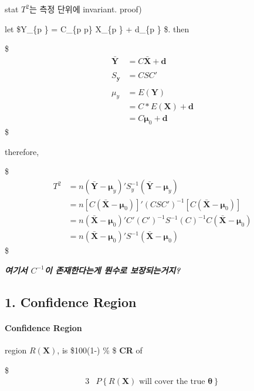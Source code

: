 \documentclass[
]{book}
\begin{document}
{{{stat \(T^2\)는 측정 단위에 invariant. proof)

let \$\pmb Y\_\{p \} = C\_\{p \times p\} \pmb X\_\{p \} + \pmb d\_\{p \} \$. then

\$
\begin{align*}
\bar {\pmb Y} &= C \bar {\pmb X} + \pmb d \\
\\

S_{\pmb y} &= CSC'\\
\\

\mu_y &= E(\pmb Y) \\
&=C \ast E(\pmb X) + \pmb d \\
&= C \pmb \mu_0 + \pmb d

\end{align*}
\$

therefore,

\$
\begin{align*}

T^2
&= n(\bar {\pmb Y} - \pmb \mu_y)' S_y^{-1} (\bar {\pmb Y} - \pmb \mu_y) \\
&= n \left[ C(\bar {\pmb X} - \pmb \mu_0) \right]' (CSC')^{-1} \left[ C(\bar {\pmb X} - \pmb \mu_0) \right] \\
&= n (\bar {\pmb X} - \pmb \mu_0)' C' (C')^{-1} S^{-1}(C)^{-1}  C(\bar {\pmb X} - \pmb \mu_0) \\
&= n (\bar {\pmb X} - \pmb \mu_0)' S^{-1}(\bar {\pmb X} - \pmb \mu_0) 

\end{align*}
\$

\textbf{\emph{여기서 \(C^{-1}\)이 존재한다는게 뭔수로 보장되는거지?}}

\hypertarget{confidence-region}{%
\subsection{1. Confidence Region}\label{confidence-region}}

\hypertarget{confidence-region-1}{%
\paragraph{Confidence Region}\label{confidence-region-1}}

region \(R(\pmb X)\), is \$100(1-\alpha) \% \$ \textbf{CR} of

\$
\begin{alignat*}{3}


&P \left\{
R(\pmb X) \text{ will cover the true } \pmb \theta 
\right\}


\end{alignat*}}}}
\end{document}
